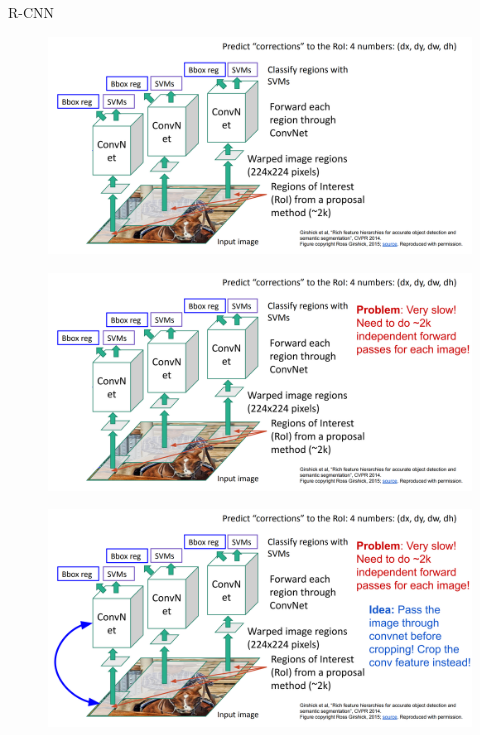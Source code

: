 \begin{frame}[allowframebreaks]{R-CNN}

\begin{figure}
\centering
\includegraphics[width=1.0\textwidth,height=1.0\textheight,keepaspectratio]{images/obj-det/rcnn_1.png}
\end{figure}

\framebreak

\begin{figure}
\centering
\includegraphics[width=1.0\textwidth,height=1.0\textheight,keepaspectratio]{images/obj-det/rcnn_2.png}
\end{figure}

\framebreak

\begin{figure}
\centering
\includegraphics[width=1.0\textwidth,height=1.0\textheight,keepaspectratio]{images/obj-det/rcnn_3.png}
\end{figure}

    
\end{frame}